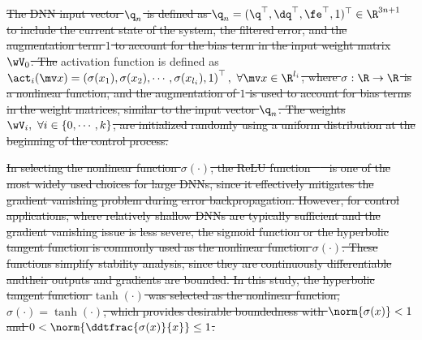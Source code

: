 \documentclass[letterpaper, journal]{IEEEtran}
\providecommand{\DIFadd}[1]{{\protect\color{blue}\uwave{#1}}} %
\providecommand{\DIFdel}[1]{{\protect\color{red}\sout{#1}}} %
\providecommand{\DIFaddbegin}{} %
\providecommand{\DIFaddend}{} %
\providecommand{\DIFdelbegin}{} %
\providecommand{\DIFdelend}{} %
\begin{document}
\DIFdel{The DNN input vector ${\q}_n$ is defined as ${\q}_n=(\q^\top,\dq^\top,\fe^\top,1)^\top\in\R^{3n+1}$ to include the current state of the system, the filtered error, and the augmentation term $1$ to account for the bias term in the input weight matrix $\wV_0$.
The }\DIFdelend \DIFaddbegin \DIFadd{The }\DIFaddend activation function is defined as \DIFdelbegin \DIFdel{$\act_i(\mv x)=\left(\sigma(x_1),\sigma(x_2),\cdots, \sigma(x_{l_{i}}), 1\right)^\top,\ \forall\mv x\in\R^{l_i}$, where $\sigma: \R\to\R$ is a nonlinear function, and the augmentation of $1$ is used to account for bias terms in the weight matrices, similar to the input vector ${\q}_n$.
The weights $\wV_i,\ \forall i\in\{0,\cdots,k\}$, are initialized randomly using a uniform distribution at the beginning of the control process.
}%

    \DIFdel{In selecting the nonlinear function $\sigma(\cdot)$, the ReLU function \mbox{%
\cite{Maas:2013aa} }\hskip0pt%
is one of the most widely used choices for large DNNs, since it effectively mitigates the gradient vanishing problem during error backpropagation. 
    However, for control applications, where relatively shallow DNNs are typically sufficient and the gradient vanishing issue is less severe, the sigmoid function or the hyperbolic tangent function is commonly used as 
the nonlinear function $\sigma(\cdot)$. 
    These functions simplify stability analysis, since they are continuously differentiable andtheir outputs and gradients are bounded. 
In this study, the hyperbolic tangent function $\tanh(\cdot)$ was selected as the nonlinear function, }%
\DIFdel{$\sigma(\cdot) = \tanh(\cdot)$, which provides desirable boundedness with $\norm{\sigma(x)}<1$ and $0<\norm{\ddtfrac{\sigma(x)}{x}}\le 1$.
}%
\end{document}
